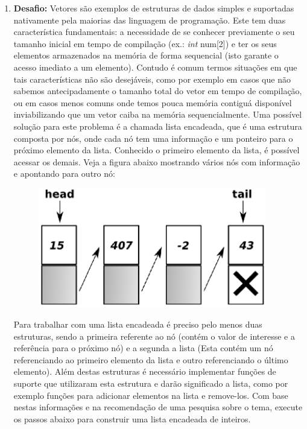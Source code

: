 \documentclass[a4paper,10pt]{article}
\begin{document}
\begin{enumerate}
 \item \textbf{Desafio:}
      Vetores são exemplos de estruturas de dados simples e suportadas nativamente pela maiorias das linguagem de programação. Este tem duas  
      característica fundamentais: a necessidade de se conhecer previamente o seu tamanho inicial em tempo de compilação (ex.: \emph{int} num[2]) e 
      ter os seus elementos armazenados na memória de forma sequencial (isto garante o acesso imediato a um elemento). Contudo é comum termos 
      situações em que tais características não são desejáveis, como por exemplo em casos que não sabemos antecipadamente o tamanho total do vetor 
      em tempo de compilação, ou em casos menos comuns onde temos pouca memória contiguá disponível inviabilizando que um vetor caiba
      na memória sequencialmente. Uma possível solução para este problema é a chamada lista encadeada, que é uma estrutura composta por nós, 
      onde cada nó tem uma informação e um ponteiro para o próximo elemento da lista. Conhecido o primeiro elemento da lista, é possível acessar os 
      demais. Veja a figura abaixo mostrando vários nós com informação e apontando para outro nó:

\begin{figure}[ht]
 \center
 \includegraphics[width=10cm]{imagem/inserir_final_lista.png}
\end{figure}

      Para trabalhar com uma lista encadeada é preciso pelo menos duas estruturas, sendo a primeira referente ao nó (contém o valor de 
      interesse e a referência para o próximo nó) e a segunda a lista (Esta contém um nó referenciando ao primeiro elemento da lista e outro
      referenciando o último elemento). Além destas estruturas é necessário implementar funções de suporte que utilizaram esta estrutura e darão 
      significado a lista, como por exemplo funções para adicionar elementos na lista e remove-los. Com base nestas informações e na recomendação de 
      uma pesquisa sobre o tema, execute os passos abaixo para construir uma lista encadeada de inteiros.
  

\end{enumerate}
\end{document}
